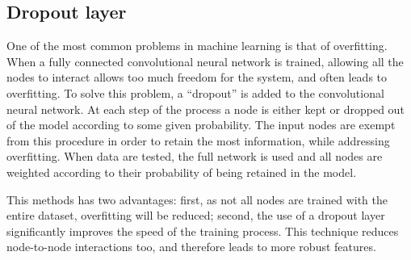\subsection{Dropout layer}
One of the most common problems in machine learning is that of overfitting. When a fully connected convolutional neural network is trained, allowing all the nodes to interact allows too much freedom for the system, and often leads to overfitting. To solve this problem, a ``dropout'' is added to the convolutional neural network. At each step of the process a node is either kept or dropped out of the model according to some given probability. The input nodes are exempt from this procedure in order to retain the most information, while addressing overfitting. When data are tested, the full network is used and all nodes are weighted according to their probability of being retained in the model.

This methods has two advantages: first, as not all nodes are trained with the entire dataset, overfitting will be reduced; second, the use of a dropout layer significantly improves the speed of the training process. This technique reduces node-to-node interactions too, and therefore leads to more robust features.
